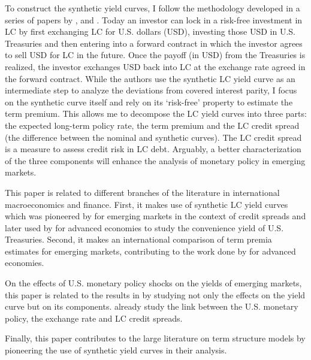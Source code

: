 To construct the synthetic yield curves, I follow the methodology developed in a series of papers by \cite{DuSchreger:2016a}, \citet*{DuImSchreger:2018} and \citet*{DuImSchreger:2018CIP}. Today an investor can lock in a risk-free investment in LC by first exchanging LC for U.S. dollars (USD), investing those USD in U.S. Treasuries and then entering into a forward contract in which the investor agrees to sell USD for LC in the future. Once the payoff (in USD) from the Treasuries is realized, the investor exchanges USD back into LC at the exchange rate agreed in the forward contract. While the authors use the synthetic LC yield curve as an intermediate step to analyze the deviations from covered interest parity, I focus on the synthetic curve itself and rely on its `risk-free' property to estimate the term premium. This allows me to decompose the LC yield curves into three parts: the expected long-term policy rate, the term premium and the LC credit spread (the difference between the nominal and synthetic curves). The LC credit spread is a measure to assess credit risk in LC debt. Arguably, a better characterization of the three components will enhance the analysis of monetary policy in emerging markets.

This paper is related to different branches of the literature in international macroeconomics and finance. First, it makes use of synthetic LC yield curves which was pioneered by \cite{DuSchreger:2016a} for emerging markets in the context of credit spreads and later used by \citet*{DuImSchreger:2018} for advanced economies to study the convenience yield of U.S. Treasuries. Second, it makes an international comparison of term premia estimates for emerging markets, contributing to the work done by \cite{Wright:2011} for advanced economies.

On the effects of U.S. monetary policy shocks on the yields of emerging markets, this paper is related to the results in \citet*{GilchristYueZakrajsek:2018} by studying not only the effects on the yield curve but on its components. \cite{HofmannShimShin:2017} already study the link between the U.S. monetary policy, the exchange rate and LC credit spreads.

Finally, this paper contributes to the large literature on term structure models by pioneering the use of synthetic yield curves in their analysis.


